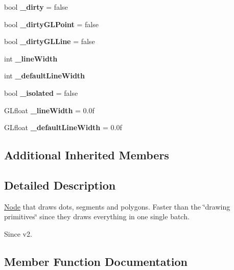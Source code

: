 \begin{DoxyCompactItemize}
\mbox{\label{classDrawNode_a45923ad8306ea09cdf6b578bd0777992}} 
bool {\bfseries \+\_\+dirty} = false
\item 
\mbox{\label{classDrawNode_ac4be36f61f36094befe91cbd78260a54}} 
bool {\bfseries \+\_\+dirty\+G\+L\+Point} = false
\item 
\mbox{\label{classDrawNode_a1f57c5febefa71431f75458f4e039efb}} 
bool {\bfseries \+\_\+dirty\+G\+L\+Line} = false
\item 
\mbox{\label{classDrawNode_a46b58e2e3463d378c7148f0fe00d69a3}} 
int {\bfseries \+\_\+line\+Width}
\item 
\mbox{\label{classDrawNode_a6883d8cfe3d75c012be088377fa9165a}} 
int {\bfseries \+\_\+default\+Line\+Width}
\item 
\mbox{\label{classDrawNode_a1a18556ab979cfc6bcc376dc09fac502}} 
bool {\bfseries \+\_\+isolated} = false
\item 
\mbox{\label{classDrawNode_ae6c402d1f270a5fe29a813c2bcfd941a}} 
G\+Lfloat {\bfseries \+\_\+line\+Width} = 0.\+0f
\item 
\mbox{\label{classDrawNode_a8b121efeb2e75a784ee5d50bc82a2ed1}} 
G\+Lfloat {\bfseries \+\_\+default\+Line\+Width} = 0.\+0f
\end{DoxyCompactItemize}
\subsection*{Additional Inherited Members}


\subsection{Detailed Description}
\hyperlink{classNode}{Node} that draws dots, segments and polygons. Faster than the \char`\"{}drawing primitives\char`\"{} since they draws everything in one single batch. 

\begin{DoxySince}{Since}
v2. 
\end{DoxySince}


\subsection{Member Function Documentation}
\mbox{\label{classDrawNode_a9e650c39c26a8ba3c912f21388b2218d}} 
